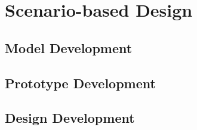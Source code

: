 



\chapter{Scenario-based Design} \label{ScenarioBasedDesign}


\section{Model Development} \label{ModDev}







\section{Prototype Development} \label{ProtDev}




\section{Design Development} \label{DesDev}



	
		
